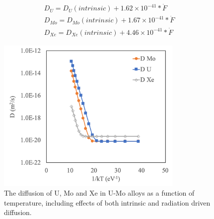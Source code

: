 \documentclass[review]{elsarticle}
\begin{document}
\begin{align}
 D_U = D_U(intrinsic) + 1.62\times10^{-41} * \dot{F} \label{eq3}  \\
 D_{Mo} = D_{Mo}(intrinsic) + 1.67\times10^{-41} * \dot{F} \label{eq4} \\
 D_{Xe} = D_{Xe}(intrinsic) + 4.46\times10^{-41} * \dot{F} \label{eq5}
\end{align}

\begin{figure}[h]
 \centering
 \includegraphics[width=0.8\textwidth]{total_diff.png} 
 \caption{The diffusion of U, Mo and Xe in U-Mo alloys as a function of temperature, including effects of both intrinsic and radiation driven diffusion.}
 \label{fig:totaldiff}
\end{figure}
\end{document}
